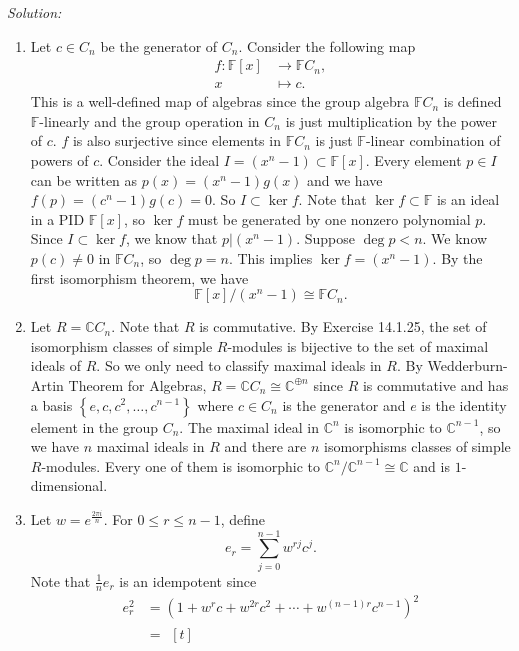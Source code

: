 \documentclass[a4paper, 12pt]{article}
\newenvironment{solution}
    {\textit{Solution:}}
    {}
\begin{document}
\begin{solution}
\begin{enumerate}[(1)]
\item Let \(c\in C_n\) be the generator of \(C_n\). Consider the following map 
\begin{align*}
    f:\mathbb{F}[x]&\rightarrow \mathbb{F}C_n,\\ 
    x&\mapsto c.
\end{align*}
This is a well-defined map of algebras since the group algebra \(\mathbb{F}C_n\) is defined \(\mathbb{F}\)-linearly and the group operation in \(C_n\) is just multiplication by the power of \(c\). \(f\) is also surjective since 
elements in \(\mathbb{F}C_n\) is just \(\mathbb{F}\)-linear combination of powers of \(c\). Consider the ideal \(I=(x^n-1)\subset \mathbb{F}[x]\). Every element \(p\in I\) can be written as 
\(p(x)=(x^n-1)g(x)\) and we have \(f(p)=(c^n-1)g(c)=0\). So \(I\subset \ker f\). Note that \(\ker f\subset \mathbb{F}\) is an ideal in a PID \(\mathbb{F}[x]\), so \(\ker f\) must be generated by one nonzero polynomial \(p\). Since \(I\subset \ker f\), we know that 
\(p|(x^n-1)\). Suppose \(\deg p<n\). We know \(p(c)\neq 0\) in \(\mathbb{F}C_n\), so \(\deg p=n\). This implies \(\ker f=(x^n-1)\). By the first isomorphism theorem, we have 
\[\mathbb{F}[x]/(x^n-1)\cong \mathbb{F}C_n.\]
\item Let \(R=\mathbb{C}C_n\). Note that \(R\) is commutative. By Exercise 14.1.25, the set of isomorphism classes of simple \(R\)-modules is bijective to the set of maximal ideals of \(R\). So we only need to classify maximal ideals in \(R\). By Wedderburn-Artin Theorem for Algebras, 
\(R=\mathbb{C}C_n\cong \mathbb{C}^{\oplus n}\) since \(R\) is commutative and has a basis \(\left\{ e,c,c^2,\ldots,c^{n-1} \right\}\) where \(c\in C_n\) is the generator and \(e\) is the identity element in the group \(C_n\). The maximal ideal in \(\mathbb{C}^n\) is isomorphic to \(\mathbb{C}^{n-1}\), so we 
have \(n\) maximal ideals in \(R\) and there are \(n\) isomorphisms classes of simple \(R\)-modules. Every one of them is isomorphic to \(\mathbb{C}^n/\mathbb{C}^{n-1}\cong \mathbb{C}\) and is \(1\)-dimensional. 
\item Let \(w=e^{\frac{2\pi i}{n}}\). For \(0\leq r\leq n-1\), define 
\[e_r=\sum_{j=0}^{n-1} w^{rj} c^j.\]
Note that \(\frac{1}{n}e_r\) is an idempotent since 
\begin{align*}
    e_r^2&=(1+w^r c+w^{2r} c^2+\cdots+w^{(n-1)r}c^{n-1})^2\\ 
         &=\begin{aligned}[t]

\end{aligned}
\end{align*}
\end{enumerate}
\end{solution}
\end{document}
